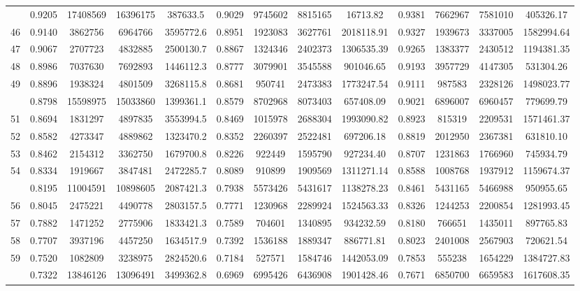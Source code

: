 \documentclass[
  12pt,
]{article}
\begin{document}
\begin{longtable}[t]{lcccccccccccc}
\addlinespace
45 & 0.9205 & 17408569 & 16396175 & 387633.5 & 0.9029 & 9745602 & 8815165 & 16713.82 & 0.9381 & 7662967 & 7581010 & 405326.17\\
46 & 0.9140 & 3862756 & 6964766 & 3595772.6 & 0.8951 & 1923083 & 3627761 & 2018118.91 & 0.9327 & 1939673 & 3337005 & 1582994.64\\
47 & 0.9067 & 2707723 & 4832885 & 2500130.7 & 0.8867 & 1324346 & 2402373 & 1306535.39 & 0.9265 & 1383377 & 2430512 & 1194381.35\\
48 & 0.8986 & 7037630 & 7692893 & 1446112.3 & 0.8777 & 3079901 & 3545588 & 901046.65 & 0.9193 & 3957729 & 4147305 & 531304.26\\
49 & 0.8896 & 1938324 & 4801509 & 3268115.8 & 0.8681 & 950741 & 2473383 & 1773247.54 & 0.9111 & 987583 & 2328126 & 1498023.77\\
\addlinespace
50 & 0.8798 & 15598975 & 15033860 & 1399361.1 & 0.8579 & 8702968 & 8073403 & 657408.09 & 0.9021 & 6896007 & 6960457 & 779699.79\\
51 & 0.8694 & 1831297 & 4897835 & 3553994.5 & 0.8469 & 1015978 & 2688304 & 1993090.82 & 0.8923 & 815319 & 2209531 & 1571461.37\\
52 & 0.8582 & 4273347 & 4889862 & 1323470.2 & 0.8352 & 2260397 & 2522481 & 697206.18 & 0.8819 & 2012950 & 2367381 & 631810.10\\
53 & 0.8462 & 2154312 & 3362750 & 1679700.8 & 0.8226 & 922449 & 1595790 & 927234.40 & 0.8707 & 1231863 & 1766960 & 745934.79\\
54 & 0.8334 & 1919667 & 3847481 & 2472285.7 & 0.8089 & 910899 & 1909569 & 1311271.14 & 0.8588 & 1008768 & 1937912 & 1159674.37\\
\addlinespace
55 & 0.8195 & 11004591 & 10898605 & 2087421.3 & 0.7938 & 5573426 & 5431617 & 1138278.23 & 0.8461 & 5431165 & 5466988 & 950955.65\\
56 & 0.8045 & 2475221 & 4490778 & 2803157.5 & 0.7771 & 1230968 & 2289924 & 1524563.33 & 0.8326 & 1244253 & 2200854 & 1281993.45\\
57 & 0.7882 & 1471252 & 2775906 & 1833421.3 & 0.7589 & 704601 & 1340895 & 934232.59 & 0.8180 & 766651 & 1435011 & 897765.83\\
58 & 0.7707 & 3937196 & 4457250 & 1634517.9 & 0.7392 & 1536188 & 1889347 & 886771.81 & 0.8023 & 2401008 & 2567903 & 720621.54\\
59 & 0.7520 & 1082809 & 3238975 & 2824520.6 & 0.7184 & 527571 & 1584746 & 1442053.09 & 0.7853 & 555238 & 1654229 & 1384727.83\\
\addlinespace
60 & 0.7322 & 13846126 & 13096491 & 3499362.8 & 0.6969 & 6995426 & 6436908 & 1901428.46 & 0.7671 & 6850700 & 6659583 & 1617608.35\\

\end{longtable}
\end{document}
